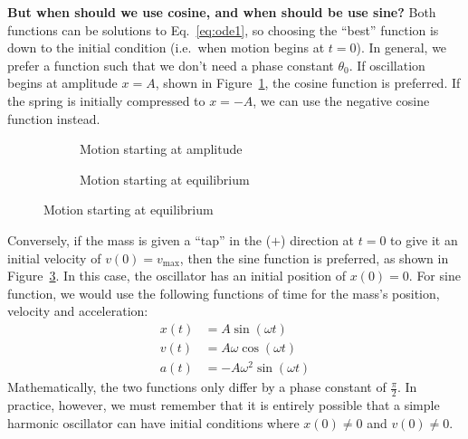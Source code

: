 \textbf{But when should we use cosine, and when should be use sine?} Both
functions can be solutions to Eq.~\ref{eq:ode1}, so choosing the ``best''
function is down to the initial condition (i.e.\ when motion begins at $t=0$).
In general, we prefer a function such that we don't need a phase constant
$\theta_0$. If oscillation begins at amplitude $x=A$, shown in
Figure~\ref{fig:start-from-A}, the cosine function is preferred. If the spring
is initially compressed to $x=-A$, we can use the negative cosine function
instead.
\begin{figure}[ht]
  \centering
  \begin{subfigure}{.45\textwidth}
    \centering
    \caption{Motion starting at amplitude}
    \label{fig:start-from-A}
  \end{subfigure}
  \begin{subfigure}{.45\textwidth}
    \centering
    \caption{Motion starting at equilibrium}
    \label{fig:start-from-0}
  \end{subfigure}
\end{figure}  

Conversely, if the mass is given a ``tap'' in the ($+$) direction at $t=0$ to
give it an initial velocity of $v(0)=v_\text{max}$, then the sine function is
preferred, as shown in Figure~\ref{fig:start-from-0}. In this case, the
oscillator has an initial position of $x(0)=0$. For sine function, we would use
the following functions of time for the mass's position, velocity and
acceleration:
\begin{align*}
  x(t)&=A\sin(\omega t)\\
  v(t)&=A\omega\cos(\omega t)\\
  a(t)&=-A\omega^2\sin(\omega t)
\end{align*}
Mathematically, the two functions only differ by a phase constant of
$\frac{\pi}2$. In practice, however, we must remember that it is entirely
possible that a simple harmonic oscillator can have initial conditions where
$x(0)\neq 0$ and $v(0)\neq 0$.

